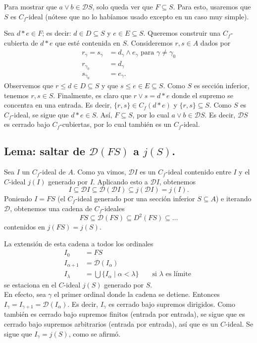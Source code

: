 \documentclass[12pt,letterpaper,titlepage]{article}
\theoremstyle{definition}
\renewcommand\sup{\vee}
\renewcommand\inf{\wedge}
\newcommand\D{\mathcal D}
\renewcommand\cal[1]{\mathcal{#1}}
\newcommand\tps[2]{\texorpdfstring{#1}{#2}}
\newcommand\<{\langle}
\renewcommand\>{\rangle}
\begin{document}
Para mostrar que $a\sup b\in\D S$,
solo queda ver que $F\subseteq S$.
Para esto, usaremos que $S$ es $C_f$-ideal (nótese que no lo
habíamos usado excepto en un caso muy simple).

Sea $d*e\in F$; es decir: $d\in D\subseteq S$ y $e\in E\subseteq S$.
Queremos construir una $C_f$-cubierta de $d*e$ que esté contenida
en $S$.
Consideremos  $r,s\in A$ dados por
\begin{align*}
  r_\gamma = s_\gamma
    &= d_\gamma \inf e_\gamma \text{ para } \gamma\neq\gamma_0 \\
  r_{\gamma_0} &= d_\gamma \\
  s_{\gamma_0} &= e_\gamma.
\end{align*}
Observemos que $r\leq d\in D\subseteq S$ y que $s\leq e\in
E\subseteq S$.
Como $S$ es sección inferior, tenemos $r,s\in S$.
Finalmente, es claro que $r\sup s = d*e$ donde el supremo se
concentra en una entrada.
Es decir, $\{r,s\}\in C_f(d*e)$ y $\{r,s\}\subseteq S$.
Como $S$ es $C_f$-ideal, se sigue que $d*e\in S$.
Así, $F\subseteq S$, por lo cual $a\sup b\in\D S$.
Es decir, $\D S$ es cerrado bajo $C_f$-cubiertas, por lo cual
también es un $C_f$-ideal.

\subsection{Lema: saltar de \tps{$\D(FS)$}{D(FS)} a \tps{$j(S)$}{j(S)}.}
    Sea $I$ un $C_f$-ideal de $A$.
    Como ya vimos, $\D I$ es un $C_f$-ideal contenido
    entre $I$ y el $C$-ideal $j(I)$ generado por $I$.
    Aplicando esto a $\D I$, obtenemos
    \[
        I\subseteq \D I
        \subseteq \D(\D I)
        \subseteq j(\D I)=j(I)
    .\]
    Poniendo $I=FS$ (el $C_f$-ideal generado por una sección
    inferior $S\subseteq A$) e iterando $\D$, obtenemos una
    cadena de $C_f$-ideales
    \[
        FS \subseteq \cal D(FS)
        \subseteq D^2(FS)
        \subseteq \dots
    \]
    contenidos en $j(FS)=j(S)$.


    La extensión de esta cadena a todos los ordinales
    \begin{align*}
        I_0 &= FS \\
        I_{\alpha+1} &= \D(I_\alpha) \\
        I_\lambda
        &= \bigcup\{I_\alpha \mid \alpha<\lambda\}
            && \text{ si $\lambda$ es límite }
    \end{align*}
    se estaciona en el $C$-ideal $j(S)$ generado por $S$. \\
    En efecto, sea $\gamma$ el primer ordinal donde la cadena
    se detiene.
    Entonces $I_\gamma=I_{\gamma+1}=\D(I_\alpha)$.
    Es decir, $I_\gamma$ es cerrado bajo supremos dirigidos.
    Como también es cerrado bajo supremos finitos
    (entrada por entrada), se sigue
    que es cerrado bajo supremos arbitrarios
    (entrada por entrada), así que es
    un $C$-ideal.
    Se sigue que $I_\gamma=j(S)$, como se afirmó.
\end{document}
